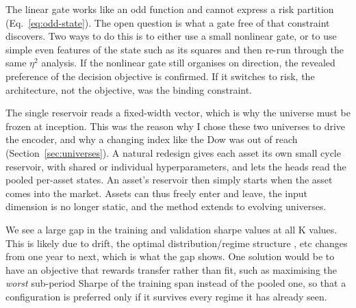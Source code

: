 The linear gate works like an odd function and cannot express a risk partition (Eq.~\ref{eq:odd-state}). The open question is what a gate free of that constraint discovers. Two ways to do this is to either use a small nonlinear gate, or to use simple even features of the state such as its squares and then re-run through the same $\eta^2$ analysis. If the nonlinear gate still organises on direction, the revealed preference of the decision objective is confirmed. If it switches to risk, the architecture, not the objective, was the binding constraint.

The single reservoir reads a fixed-width vector, which is why the universe must be frozen at inception. This was the reason why I chose these two universes to drive the encoder, and why a changing index like the Dow was out of reach (Section~\ref{sec:universes}). A natural redesign gives each asset its own small cycle reservoir, with shared or individual hyperparameters, and lets the heads read the pooled per-asset states. An asset's reservoir then simply starts when the asset comes into the market. Assets can thus freely enter and leave, the input dimension is no longer static, and the method extends to evolving universes.

We see a large gap in the training and validation sharpe values at all K values. This is likely due to drift, the optimal distribution/regime structure , etc changes from one year to next, which is what the gap shows. One solution would be to have an objective that rewards transfer rather than fit, such as maximising the \emph{worst} sub-period Sharpe of the training span instead of the pooled one, so that a configuration is preferred only if it survives every regime it has already seen.